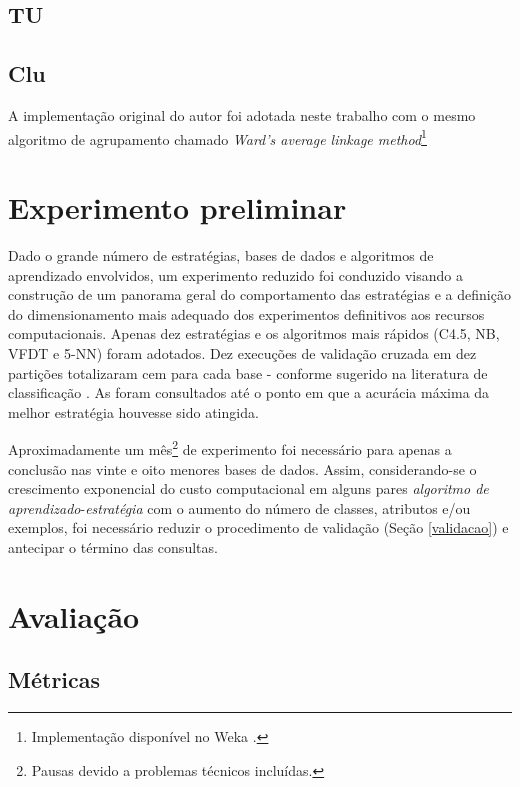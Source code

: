 \subsection{TU}

\subsection{Clu}
A implementação original do autor foi adotada neste trabalho com o mesmo
algoritmo de agrupamento chamado
\textit{Ward's average linkage method}\footnote{
Implementação disponível no Weka \cite{journals/sigkdd/HallFHPRW09}.}

\section{Experimento preliminar}\label{preliminar}
Dado o grande número de estratégias, bases de dados e algoritmos de aprendizado envolvidos,
um experimento reduzido \citep{conf/hais/SantosC14} foi conduzido visando
a construção de um panorama geral do comportamento das estratégias
e a definição do dimensionamento mais adequado dos experimentos definitivos
aos recursos computacionais.
Apenas dez estratégias e os algoritmos mais rápidos (C4.5, NB, VFDT e 5-NN)
foram adotados.
Dez execuções de validação cruzada em dez partições totalizaram cem \pools
para cada base - conforme sugerido na literatura de classificação
\cite{conf/pakdd/BouckaertF04}.
As \pools foram consultados até o ponto em que a acurácia máxima da
melhor estratégia houvesse sido atingida.

Aproximadamente um mês\footnote{Pausas devido a problemas técnicos incluídas.}
de experimento foi necessário para apenas a conclusão
nas vinte e oito menores bases de dados.
Assim, considerando-se o crescimento exponencial do custo computacional em alguns
pares \textit{algoritmo de aprendizado}-\textit{estratégia} com o aumento do número
de classes, atributos e/ou exemplos, foi necessário reduzir o procedimento
de validação (Seção \ref{validacao}) e antecipar o término das
consultas.

\section{Avaliação}\label{avaliacao}

\subsection{Métricas}\label{metricas}

